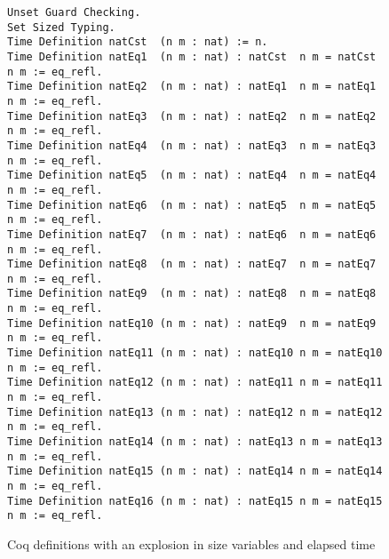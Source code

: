 \begin{figure}[h]
\begin{verbatim}
Unset Guard Checking.
Set Sized Typing.
Time Definition natCst  (n m : nat) := n.
Time Definition natEq1  (n m : nat) : natCst  n m = natCst  n m := eq_refl.
Time Definition natEq2  (n m : nat) : natEq1  n m = natEq1  n m := eq_refl.
Time Definition natEq3  (n m : nat) : natEq2  n m = natEq2  n m := eq_refl.
Time Definition natEq4  (n m : nat) : natEq3  n m = natEq3  n m := eq_refl.
Time Definition natEq5  (n m : nat) : natEq4  n m = natEq4  n m := eq_refl.
Time Definition natEq6  (n m : nat) : natEq5  n m = natEq5  n m := eq_refl.
Time Definition natEq7  (n m : nat) : natEq6  n m = natEq6  n m := eq_refl.
Time Definition natEq8  (n m : nat) : natEq7  n m = natEq7  n m := eq_refl.
Time Definition natEq9  (n m : nat) : natEq8  n m = natEq8  n m := eq_refl.
Time Definition natEq10 (n m : nat) : natEq9  n m = natEq9  n m := eq_refl.
Time Definition natEq11 (n m : nat) : natEq10 n m = natEq10 n m := eq_refl.
Time Definition natEq12 (n m : nat) : natEq11 n m = natEq11 n m := eq_refl.
Time Definition natEq13 (n m : nat) : natEq12 n m = natEq12 n m := eq_refl.
Time Definition natEq14 (n m : nat) : natEq13 n m = natEq13 n m := eq_refl.
Time Definition natEq15 (n m : nat) : natEq14 n m = natEq14 n m := eq_refl.
Time Definition natEq16 (n m : nat) : natEq15 n m = natEq15 n m := eq_refl.
\end{verbatim}
\caption{Coq definitions with an explosion in size variables and elapsed time}
\label{fig:nateq}
\end{figure}


